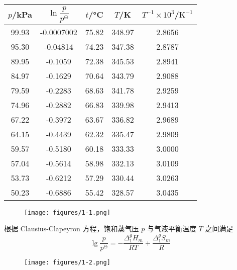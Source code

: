 \begin{table}[htbp]
    \centering
    \begin{tabular}{ccccc}
        \toprule
        $p$/\si{kPa} & $\ln\dfrac{p}{p^\ominus}$ & $t$/\si{\celsius} & $T$/\si{K} & $T^{-1}\times10^{3} $/$\mathrm{K^{-1}}$ \\
        \midrule
        99.93 & -0.0007002 & 75.82 & 348.97 & 2.8656 \\
        95.30 & -0.04814 & 74.23 & 347.38 & 2.8787 \\
        89.95 & -0.1059 & 72.38 & 345.53 & 2.8941 \\
        84.97 & -0.1629 & 70.64 & 343.79 & 2.9088 \\
        79.59 & -0.2283 & 68.63 & 341.78 & 2.9259 \\
        74.96 & -0.2882 & 66.83 & 339.98 & 2.9413 \\
        67.22 & -0.3972 & 63.67 & 336.82 & 2.9689 \\
        64.15 & -0.4439 & 62.32 & 335.47 & 2.9809 \\
        59.57 & -0.5180 & 60.18 & 333.33 & 3.0000 \\
        57.04 & -0.5614 & 58.98 & 332.13 & 3.0109 \\
        53.73 & -0.6212 & 57.29 & 330.44 & 3.0263 \\
        50.23 & -0.6886 & 55.42 & 328.57 & 3.0435 \\
        \bottomrule
    \end{tabular}
    \label{tab:2}
\end{table}

\begin{figure}[htbp]
    \centering
    \texttt{[image: figures/1-1.png]}
    \label{fig:1}
\end{figure}

根据 Clausius-Clapeyron 方程，饱和蒸气压 $p$ 与气液平衡温度 $T$ 之间满足
\begin{equation}\label{eq:1}
    \lg \frac{p}{p^{\ominus}}=-\frac{\Delta_1^{g} H_m}{RT}+\frac{\Delta_1^{g} S_m}{R}
\end{equation}

\begin{figure}
    \centering
    \texttt{[image: figures/1-2.png]}
    \label{fig:2}
\end{figure}

